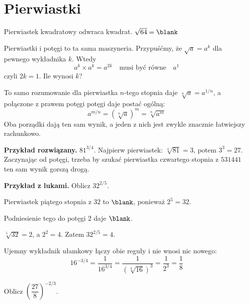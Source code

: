 \section{Pierwiastki}
\label{sec:F01-roots}

\begin{fr}
Pierwiastek kwadratowy odwraca kwadrat. $\sqrt{64} = \blank$
\nextframe
\end{fr}

\begin{fr}
Pierwiastki i potęgi to ta sama maszyneria. Przypuśćmy, że $\sqrt{a} = a^{k}$
dla pewnego wykładnika $k$. Wtedy
\[ a^{k} \times a^{k} = a^{2k} \quad\text{musi być równe}\quad a^{1} \]
czyli $2k = 1$. Ile wynosi $k$?
\nextframe
\end{fr}

\begin{fr}
To samo rozumowanie dla pierwiastka $n$-tego stopnia daje
$\sqrt[n]{a} = a^{1/n}$, a połączone z prawem potęgi potęgi daje postać
ogólną:
\[ a^{m/n} = \left(\sqrt[n]{a}\right)^{m} = \sqrt[n]{a^{m}} \]
Oba porządki dają ten sam wynik, a jeden z nich jest zwykle znacznie
łatwiejszy rachunkowo.

\textbf{Przykład rozwiązany.} $81^{3/4}$. Najpierw pierwiastek:
$\sqrt[4]{81} = 3$, potem $3^{3} = 27$. Zaczynając od potęgi, trzeba by szukać
pierwiastka czwartego stopnia z $531441$ \dash{} ten sam wynik gorszą drogą.
\end{fr}

\begin{fr}
\textbf{Przykład z lukami.} Oblicz $32^{2/5}$.

Pierwiastek piątego stopnia z $32$ to $\blank$, ponieważ $2^{5} = 32$.

Podniesienie tego do potęgi $2$ daje $\blank$.
\dotline
\nextframe
\end{fr}

\begin{fr}
\begin{ansblock}
$\sqrt[5]{32} = 2$, a $2^{2} = 4$. Zatem $32^{2/5} = 4$.
\end{ansblock}

Ujemny wykładnik ułamkowy łączy obie reguły i nie wnosi nic nowego:
\[ 16^{-3/4} = \frac{1}{16^{3/4}} = \frac{1}{(\sqrt[4]{16})^{3}}
             = \frac{1}{2^{3}} = \frac{1}{8} \]

\yourturn
Oblicz $\left(\dfrac{27}{8}\right)^{-2/3}$.
\dotline
\nextframe
\end{fr}

